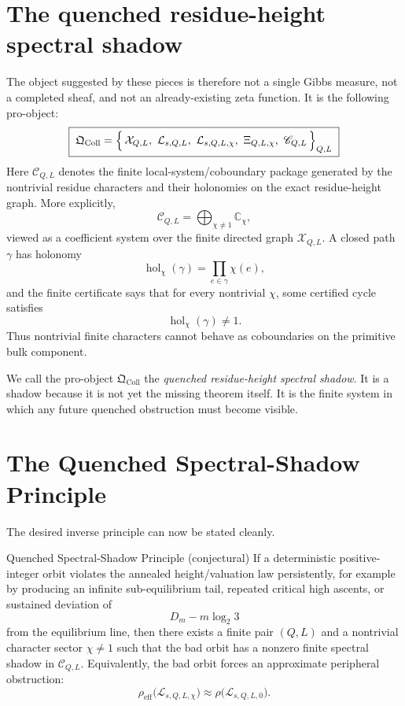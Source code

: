 \documentclass[11pt]{article}
\newcommand{\C}{\mathbb{C}}
\newcommand{\Xcal}{\mathcal{X}}
\newcommand{\Lcal}{\mathcal{L}}
\newcommand{\Ccal}{\mathscr{C}}
\newcommand{\Qcoll}{\mathfrak{Q}_{\mathrm{Coll}}}
\DeclareMathOperator{\hol}{hol}
\theoremstyle{remark}
\begin{document}
\section{The quenched residue-height spectral shadow}

The object suggested by these pieces is therefore not a single Gibbs measure, not a
completed sheaf, and not an already-existing zeta function. It is the following pro-object:
\[
\boxed{\;
\Qcoll = \Bigl\{\, \Xcal_{Q,L},\ \Lcal_{s,Q,L},\ \Lcal_{s,Q,L,\chi},\
\Xi_{Q,L,\chi},\ \Ccal_{Q,L} \,\Bigr\}_{Q,L}
\;}
\]
Here $\Ccal_{Q,L}$ denotes the finite local-system/coboundary package generated by the
nontrivial residue characters and their holonomies on the exact residue-height graph. More
explicitly,
\[
\Ccal_{Q,L} = \bigoplus_{\chi\ne 1} \C_\chi,
\]
viewed as a coefficient system over the finite directed graph $\Xcal_{Q,L}$. A closed path
$\gamma$ has holonomy
\[
\hol_\chi(\gamma) = \prod_{e\in\gamma} \chi(e),
\]
and the finite certificate says that for every nontrivial $\chi$, some certified cycle
satisfies
\[
\hol_\chi(\gamma) \ne 1.
\]
Thus nontrivial finite characters cannot behave as coboundaries on the primitive bulk
component.

We call the pro-object $\Qcoll$ the \emph{quenched residue-height spectral shadow}. It is a
shadow because it is not yet the missing theorem itself. It is the finite system in which
any future quenched obstruction must become visible.

\section{The Quenched Spectral-Shadow Principle}

The desired inverse principle can now be stated cleanly.

\begin{principlebox}{Quenched Spectral-Shadow Principle (conjectural)}
If a deterministic positive-integer orbit violates the annealed height/valuation law
persistently, for example by producing an infinite sub-equilibrium tail, repeated critical
high ascents, or sustained deviation of
\[
D_m - m\log_2 3
\]
from the equilibrium line, then there exists a finite pair $(Q,L)$ and a nontrivial
character sector $\chi\ne 1$ such that the bad orbit has a nonzero finite spectral shadow in
$\Ccal_{Q,L}$. Equivalently, the bad orbit forces an approximate peripheral obstruction:
\[
\rho_{\mathrm{eff}}\bigl(\Lcal_{s,Q,L,\chi}\bigr)
\approx
\rho\bigl(\Lcal_{s,Q,L,0}\bigr).
\]
\end{principlebox}
\end{document}
